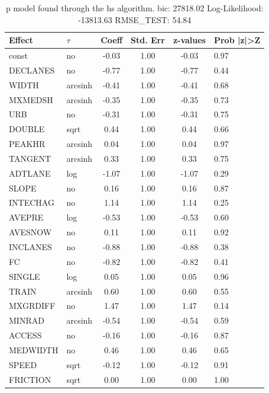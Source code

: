 \begin{table}
	\caption{p model found through the hs algorithm. bic: 27818.02 Log-Likelihood: -13813.63 RMSE_TEST: 54.84}
	\begin{center}
		\begin{tabular}{|l|l|c|c|c|l|}
			\hline
			Effect & $\tau$ & Coeff & Std. Err & z-values & Prob |z|>Z \\
			\hline
			const & no & -0.03 & 1.00 & -0.03 & 0.97 \\
			\hline
			DECLANES & no & -0.77 & 1.00 & -0.77 & 0.44 \\
			\hline
			WIDTH & arcsinh & -0.41 & 1.00 & -0.41 & 0.68 \\
			\hline
			MXMEDSH & arcsinh & -0.35 & 1.00 & -0.35 & 0.73 \\
			\hline
			URB & no & -0.31 & 1.00 & -0.31 & 0.75 \\
			\hline
			DOUBLE & sqrt & 0.44 & 1.00 & 0.44 & 0.66 \\
			\hline
			PEAKHR & arcsinh & 0.04 & 1.00 & 0.04 & 0.97 \\
			\hline
			TANGENT & arcsinh & 0.33 & 1.00 & 0.33 & 0.75 \\
			\hline
			ADTLANE & log & -1.07 & 1.00 & -1.07 & 0.29 \\
			\hline
			SLOPE & no & 0.16 & 1.00 & 0.16 & 0.87 \\
			\hline
			INTECHAG & no & 1.14 & 1.00 & 1.14 & 0.25 \\
			\hline
			AVEPRE & log & -0.53 & 1.00 & -0.53 & 0.60 \\
			\hline
			AVESNOW & no & 0.11 & 1.00 & 0.11 & 0.92 \\
			\hline
			INCLANES & no & -0.88 & 1.00 & -0.88 & 0.38 \\
			\hline
			FC & no & -0.82 & 1.00 & -0.82 & 0.41 \\
			\hline
			SINGLE & log & 0.05 & 1.00 & 0.05 & 0.96 \\
			\hline
			TRAIN & arcsinh & 0.60 & 1.00 & 0.60 & 0.55 \\
			\hline
			MXGRDIFF & no & 1.47 & 1.00 & 1.47 & 0.14 \\
			\hline
			MINRAD & arcsinh & -0.54 & 1.00 & -0.54 & 0.59 \\
			\hline
			ACCESS & no & -0.16 & 1.00 & -0.16 & 0.87 \\
			\hline
			MEDWIDTH & no & 0.46 & 1.00 & 0.46 & 0.65 \\
			\hline
			SPEED & sqrt & -0.12 & 1.00 & -0.12 & 0.91 \\
			\hline
			FRICTION & sqrt & 0.00 & 1.00 & 0.00 & 1.00 \\

\end{tabular}
\end{center}
\end{table}
